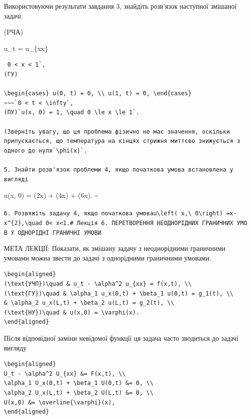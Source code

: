 \documentclass[
  ukrainian,
]{article}
\begin{document}
Використовуючи результати завдання 3, знайдіть розв'язок наступної
змішаної задачі:

(PЧА)

u\_t = u\_\{xx\}

\begin{verbatim}
 0 < x < 1`, 
(ГУ)

\begin{cases} u(0, t) = 0, \\ u(1, t) = 0, \end{cases}
~~~`0 < t < \infty`, 
(ПУ)`u(x, 0) = 1, \quad 0 \le x \le 1`.

(Зверніть увагу, що ця проблема фізично не має значення, оскільки припускається, що температура на кінцях стрижня миттєво знижується з одного до нуля`\phi(x)`.

5. Знайти розв'язок проблеми 4, якщо початкова умова встановлена у вигляді
\end{verbatim}

u(x, 0) = \sin(2\pi x) + \sin(4\pi x) +
\sin(6\pi x). \textsubscript{}\textasciitilde{}

\texttt{6.\ Розв\textquotesingle{}яжіть\ задачу\ 4,\ якщо\ початкова\ умова\textquotesingle{}u\textbackslash{}left(\ x,\textbackslash{}\ 0\textbackslash{}right)\ =x-x\^{}\{2\},\textbackslash{}quad\ 0\textless{}\ x\textless{}1.\textquotesingle{}\#\ Лекція\ 6.\ ПЕРЕТВОРЕННЯ\ НЕОДНОРІДНИХ\ ГРАНИЧНИХ\ УМОВ\ У\ ОДНОРІДНІ\ ГРАНИЧНІ\ УМОВИ}

МЕТА ЛЕКЦІЇ: Показати, як змішану задачу з неоднорідними граничними
умовами можна звести до задачі з однорідними граничними умовами.

\begin{verbatim}
\begin{aligned}
(\text{УЧП})\quad & u_t - \alpha^2 u_{xx} = f(x,t), \\
(\text{ГУ})\quad & \alpha_1 u_x(0,t) + \beta_1 u(0,t) = g_1(t), \\
& \alpha_2 u_x(L,t) + \beta_2 u(L,t) = g_2(t), \\
(\text{НУ})\quad & u(x,0) = \varphi(x).
\end{aligned}
\end{verbatim}

Після відповідної заміни невідомої функції ця задача часто зводиться до
задачі вигляду

\begin{verbatim}
\begin{aligned}
U_t - \alpha^2 U_{xx} &= F(x,t), \\
\alpha_1 U_x(0,t) + \beta_1 U(0,t) &= 0, \\
\alpha_2 U_x(L,t) + \beta_2 U(L,t) &= 0, \\
U(x,0) &= \overline{\varphi}(x),
\end{aligned}
\end{verbatim}
\end{document}

